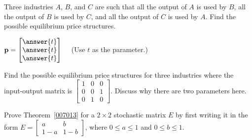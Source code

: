 \documentclass{ximera}
\begin{document}
\begin{problem}\label{prob:i/o_5}
Three industries $A$, $B$, and $C$ are such that all the output of $A$ is used by $B$, all the output of $B$ is used by $C$, and all the output of $C$ is used by $A$. Find the possible equilibrium price structures.


${\bf p}=\begin{bmatrix}
\answer{t} \\
\answer{t} \\
\answer{t}
\end{bmatrix} \quad$ (Use $t$ as the parameter.)

\end{problem}

\begin{problem}\label{prob:i/o_6}
Find the possible equilibrium price structures for three industries where the input-output matrix is $\begin{bmatrix}
1 & 0 & 0 \\
0 & 0 & 1 \\
0 & 1 & 0
\end{bmatrix}$. Discuss why there are two parameters here.
\end{problem}

\begin{problem}\label{prob:2x2proof}
Prove Theorem~\ref{007013} for a $2 \times 2$ stochastic matrix $E$ by first writing it in the form $E = \begin{bmatrix}
a & b \\
1 - a & 1 - b
\end{bmatrix}$, where $0 \leq a \leq 1$ and $0 \leq b \leq 1$.

\end{problem}
\end{document}
